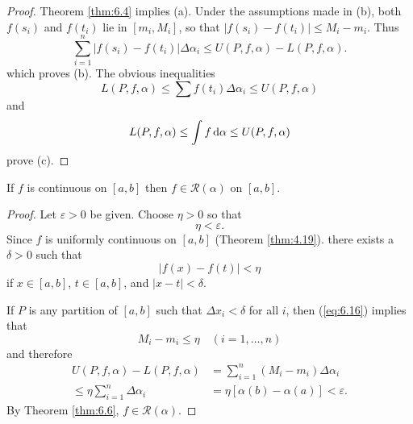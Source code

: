 \begin{proof}
    Theorem \ref{thm:6.4} implies (a). 
    Under the assumptions made in (b),
    both $f(s_i)$ and $f(t_i)$ lie in $[m_i, M_i]$, 
    so that $\left| f(s_i) - f(t_i) \right| \leq M_i - m_i$. 
    Thus
    \begin{equation*}
        \sum_{i=1}^{n} \left| f(s_i) - f(t_i) \right| \Delta \alpha_i \leq
        U(P, f, \alpha) -
        L(P, f, \alpha).
    \end{equation*}
    which proves (b). 
    The obvious inequalities
    \begin{equation*}
        L(P, f, \alpha) \leq
        \sum f(t_i) \Delta \alpha_i \leq
        U(P, f, \alpha)
    \end{equation*}
    and
    \begin{equation*}
        L(P, f, \alpha) \leq
        \int f \d \alpha \leq
        U(P, f, \alpha)
    \end{equation*}
    prove (c).
\end{proof}

\begin{thm}
    \label{thm:6.8}
    If $f$ is continuous on $[a, b]$ then $f \in \mathscr{R}(\alpha)$ on $[a, b]$.
\end{thm}

\begin{proof}
    Let $\varepsilon > 0$ be given.
    Choose $\eta > 0$ so that 
    \begin{equation*}
        [\alpha(b) - \alpha(a)]\eta < \varepsilon.
    \end{equation*}
    Since $f$ is uniformly continuous on $[a, b]$ (Theorem \ref{thm:4.19}).
    there exists a $\delta > 0$ such that 
    \begin{equation}
        \label{eq:6.16}
        \left| f(x) - f(t) \right| < \eta
    \end{equation}
    if $x \in [a, b]$, $t \in [a, b]$, and $\left| x-t \right| < \delta$.

    If $P$ is any partition of $[a, b]$ 
    such that $\Delta x_i < \delta$ for all $i$,
    then (\ref{eq:6.16}) implies that 
    \begin{equation}
        \label{eq:6.17}
        M_i - m_i \leq \eta 
        \quad
        (i = 1,\dots,n)
    \end{equation}
    and therefore 
    \begin{align*}
        U(P, f, \alpha) - L(P, f, \alpha)
        &= \sum_{i=1}^{n} \left( M_i - m_i \right) \Delta \alpha_i \\
        \leq \eta \sum_{i=1}^{n} \Delta \alpha_i 
        &= \eta \left[ \alpha (b) - \alpha (a) \right] < \varepsilon.
    \end{align*}
    By Theorem \ref{thm:6.6}, $f \in \mathscr{R}(\alpha)$.
\end{proof}

